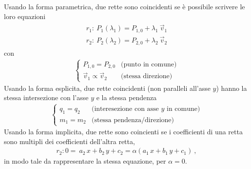 \documentclass[letterpaper,10pt,italian]{jupyterBook}
\begin{document}
\sphinxAtStartPar
Usando la forma parametrica, due rette sono coincidenti se è possibile scrivere le loro equazioni
\begin{equation*}
\begin{split}\begin{aligned}
  r_1: \ P_1(\lambda_1) = P_{1,0} + \lambda_1 \ \vec{v}_1 \\
  r_2: \ P_2(\lambda_2) = P_{2,0} + \lambda_2 \ \vec{v}_2
\end{aligned}\end{split}
\end{equation*}
\sphinxAtStartPar
con
\begin{equation*}
\begin{split}\begin{cases}
   P_{1,0} = P_{2,0} & \text{(punto in comune)} \\
   \vec{v}_1 \propto \vec{v}_2 & \text{(stessa direzione)}
\end{cases}\end{split}
\end{equation*}
\sphinxAtStartPar
Usando la forma esplicita, due rette coincidenti (non paralleli all’asse \(y\)) hanno la stessa intersezione con l’asse \(y\) e la stessa pendenza
\begin{equation*}
\begin{split}\begin{cases}
  q_1 = q_2 & \text{(interesezione con asse $y$ in comune)} \\
  m_1 = m_2 & \text{(stessa pendenza/direzione)}
\end{cases}\end{split}
\end{equation*}
\sphinxAtStartPar
Usando la forma implicita, due rette sono coincienti se i coefficienti di una retta sono multipli dei coefficienti dell’altra retta,
\begin{equation*}
\begin{split}r_2: 0 = \ a_2 \, x + b_2 \, y + c_2 = \alpha (a_1 \, x + b_1 \, y + c_1) \ , \end{split}
\end{equation*}
\sphinxAtStartPar
in modo tale da rappresentare la stessa equazione, per \(\alpha = 0\).
\end{document}
